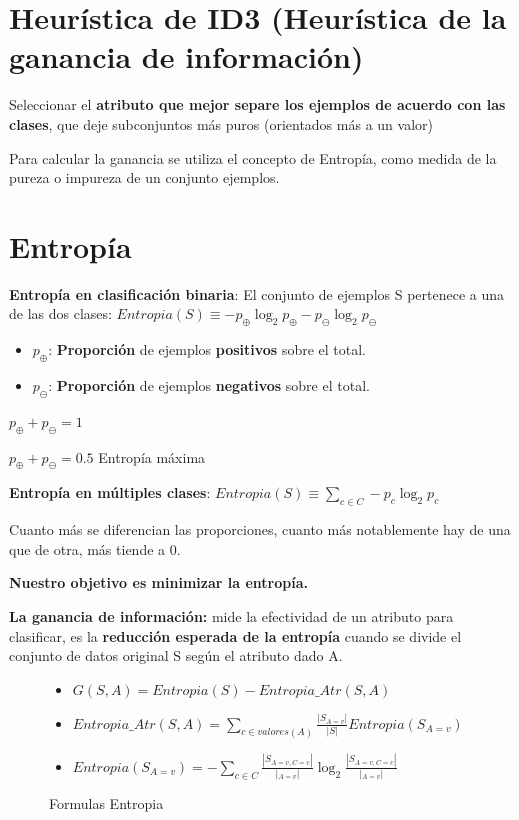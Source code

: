 \documentclass[12pt]{report} %
\begin{document}
\section{Heurística de ID3 (Heurística de la ganancia de
información)}

Seleccionar el \textbf{atributo que mejor separe los ejemplos de acuerdo
con las clases}, que deje subconjuntos más puros (orientados más a un
valor)

Para calcular la ganancia se utiliza el concepto de Entropía, como
medida de la pureza o impureza de un conjunto ejemplos.
\pagebreak
\section{Entropía}

\textbf{Entropía en clasificación binaria}: El conjunto de ejemplos S
pertenece a una de las dos clases:
\textbf{\(Entropia(S) \equiv -p_\oplus \log _2 p_\oplus -p_\ominus \log _2 p_\ominus\)}

\begin{itemize}
\item
  \(p_\oplus\): \textbf{Proporción} de ejemplos \textbf{positivos} sobre
  el total.
\item
  \(p_\ominus\): \textbf{Proporción} de ejemplos \textbf{negativos}
  sobre el total.
\end{itemize}

\(p_\oplus+p_\ominus=1\)

\(p_\oplus+p_\ominus=0.5\) Entropía máxima

\textbf{Entropía en múltiples clases}:
\(Entropia(S) \equiv \sum_{c\in C} -p_c \log _2 p_c\)

Cuanto más se diferencian las proporciones, cuanto más notablemente hay de una que de otra, más tiende a 0.

\textbf{Nuestro objetivo es minimizar la entropía.}

\textbf{La ganancia de información:} mide la efectividad de un atributo
para clasificar, es la \textbf{reducción esperada de la entropía} cuando
se divide el conjunto de datos original S según el atributo dado A.
\begin{figure}[H]
  \begin{itemize}
    \item
      \(G(S,A)=Entropia(S) - Entropia\_ Atr(S,A)\)
    \item
      \(Entropia\_ Atr(S,A)= \sum_{c \in valores(A)} \frac {|S_{A=v}|}{|S|} Entropia(S_{A=v})\)
    \item
      \(Entropia(S_{A=v})= -\sum_{c \in C} \frac {|S_{A=v,C=c}|}{|_{A=v}|} \log_2 \frac {|S_{A=v,C=c}|}{|_{A=v}|}\)
    \end{itemize}
    \captionsetup{justification=centering}
  \caption{Formulas Entropia}
\end{figure}
\end{document}
